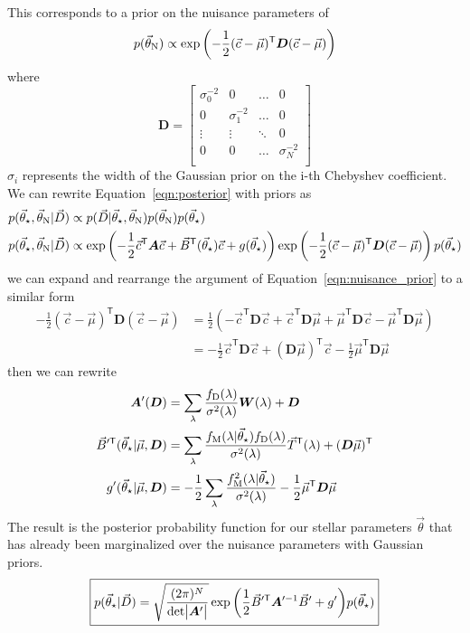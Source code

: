 \documentclass[preprint]{aastex} %
\newcommand{\vt}{\vec{\theta}}
\newcommand{\vstar}{\vt_{\star}}
\newcommand{\vN}{\vt_{\rm N}}
\newcommand{\vc}{\vec{c}}
\newcommand{\fM}{f_{\rm M}}
\newcommand{\fD}{f_{\rm D}}
\newcommand{\vD}{\vec{D}}
\newcommand{\trans}{\mathsf{T}}
\begin{document}
This corresponds to a prior on the nuisance parameters of
\begin{equation}
  p(\vN) \propto \exp \left ( -\frac{1}{2} (\vc - \vec{\mu})^\trans {\bm D} (\vc - \vec{\mu}) \right )
  \label{eqn:nuisance_prior} 
\end{equation}
where 
\begin{equation}
  {\bm D} = 
  \begin{bmatrix}
    \sigma_0^{-2} & 0 & \hdots & 0 \\
    0 & \sigma_1^{-2} & \hdots & 0 \\
    \vdots & \vdots & \ddots & 0 \\
    0 & 0 & \hdots & \sigma_N^{-2} \\
  \end{bmatrix}
\end{equation}
$\sigma_i$ represents the width of the Gaussian prior on the i-th Chebyshev coefficient. We can rewrite Equation~\ref{eqn:posterior} with priors as
\begin{align}
  p(\vstar, \vN | \vD) &\propto p( \vD | \vstar, \vN) p(\vN) p(\vstar)\\
  p(\vstar, \vN | \vD) &\propto \exp \left ( - \frac{1}{2} \vc^\trans {\bm A} \vc + \vec{B}^\trans(\vstar) \vc + g(\vstar) \right )  \exp \left ( -\frac{1}{2} (\vc - \vec{\mu})^\trans {\bm D} (\vc - \vec{\mu}) \right ) p(\vstar)
  \label{eqn:posterior_prior}
\end{align}
we can expand and rearrange the argument of Equation~\ref{eqn:nuisance_prior} to a similar form 
\begin{align}
  -\frac{1}{2} (\vc - \vec{\mu})^\trans {\bm D} (\vc - \vec{\mu}) &= \frac{1}{2}\left ( -\vc^\trans {\bm D} \vc + \vc^\trans {\bm D} \vec{\mu} + \vec{\mu}^\trans {\bm D} \vc - \vec{\mu}^\trans {\bm D} \vec{\mu} \right )\\
  &= -\frac{1}{2} \vc^\trans {\bm D} \vc + ({\bm D} \vec{\mu})^\trans \vc - \frac{1}{2} \vec{\mu}^\trans {\bm D} \vec{\mu}
\end{align}
then we can rewrite
\begin{align}
  {\bm A}^\prime({\bm D}) &= \sum_\lambda \frac{\fD(\lambda)}{\sigma^2(\lambda)} {\bm W}(\lambda) + {\bm D}\\
  \vec{B}^{\prime\trans}(\vstar | \vec{\mu}, {\bm D}) &= \sum_\lambda \frac{\fM(\lambda | \vstar) \fD(\lambda)}{\sigma^2(\lambda)} \vec{T}^\trans(\lambda) + ({\bm D} \vec{\mu})^\trans \\
  g^\prime(\vstar | \vec{\mu}, {\bm D}) &= -\frac{1}{2} \sum_\lambda \frac{\fM^2(\lambda|\vstar)}{\sigma^2(\lambda)}- \frac{1}{2} \vec{\mu}^\trans {\bm D} \vec{\mu}\\
\end{align}
The result is the posterior probability function for our stellar parameters $\vt$ that has already been marginalized over the nuisance parameters with Gaussian priors.
\begin{equation}
  \boxed{
  p(\vstar | \vD) = \sqrt{\frac{(2 \pi )^N}{ {\rm det} \bigl |{\bm A}^\prime \bigr |}} \exp{ \left ( \frac{1}{2} \vec{B}^{\prime\trans} {\bm A}^{\prime -1} \vec{B}^\prime + g^\prime \right )} p(\vstar)
}
\end{equation}
\end{document}
